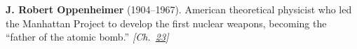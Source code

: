 \textbf{J. Robert Oppenheimer} (1904–1967). American theoretical physicist who led the Manhattan Project to develop the first nuclear weapons, becoming the ``father of the atomic bomb.'' \emph{[Ch.~\hyperref[ch:blackholetimedilationredshift]{23}]}

